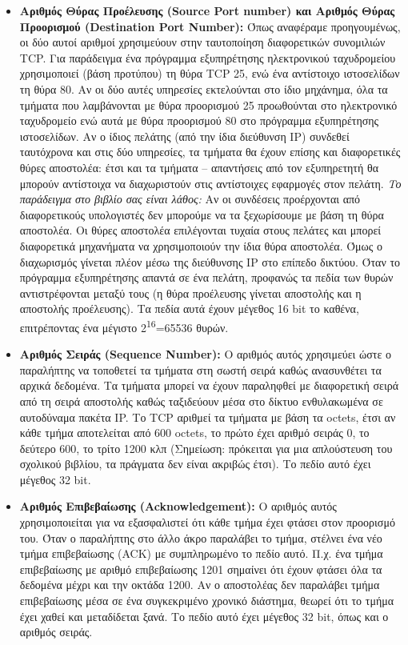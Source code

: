 \begin{itemize}
\item \textbf{Αριθμός Θύρας Προέλευσης (Source Port number) και Αριθμός Θύρας Προορισμού (Destination Port Number):} Όπως αναφέραμε προηγουμένως, οι δύο αυτοί αριθμοί χρησιμεύουν στην ταυτοποίηση διαφορετικών συνομιλιών TCP. Για παράδειγμα ένα πρόγραμμα εξυπηρέτησης ηλεκτρονικού ταχυδρομείου χρησιμοποιεί (βάση προτύπου) τη θύρα TCP 25, ενώ ένα αντίστοιχο ιστοσελίδων τη θύρα 80. Αν οι δύο αυτές υπηρεσίες εκτελούνται στο ίδιο μηχάνημα, όλα τα τμήματα που λαμβάνονται με θύρα προορισμού 25 προωθούνται στο ηλεκτρονικό ταχυδρομείο ενώ αυτά με θύρα προορισμού 80 στο πρόγραμμα εξυπηρέτησης ιστοσελίδων. Αν ο ίδιος πελάτης (από την ίδια διεύθυνση IP) συνδεθεί ταυτόχρονα και στις δύο υπηρεσίες, τα τμήματα θα έχουν επίσης και διαφορετικές θύρες αποστολέα: έτσι και τα τμήματα -- απαντήσεις από τον εξυπηρετητή θα μπορούν αντίστοιχα να διαχωριστούν στις αντίστοιχες εφαρμογές στον πελάτη. \emph{Το παράδειγμα στο βιβλίο σας είναι λάθος:} Αν οι συνδέσεις προέρχονται από διαφορετικούς υπολογιστές δεν μπορούμε να τα ξεχωρίσουμε με βάση τη θύρα αποστολέα. Οι θύρες αποστολέα επιλέγονται τυχαία στους πελάτες και μπορεί διαφορετικά μηχανήματα να χρησιμοποιούν την ίδια θύρα αποστολέα. Όμως ο διαχωρισμός γίνεται πλέον μέσω της διεύθυνσης IP στο επίπεδο δικτύου. Όταν το πρόγραμμα εξυπηρέτησης απαντά σε ένα πελάτη, προφανώς τα πεδία των θυρών αντιστρέφονται μεταξύ τους (η θύρα προέλευσης γίνεται αποστολής και η αποστολής προέλευσης). Τα πεδία αυτά έχουν μέγεθος 16 bit το καθένα, επιτρέποντας ένα μέγιστο 2\textsuperscript{16}=65536 θυρών.
\item \textbf{Αριθμός Σειράς (Sequence Number):} Ο αριθμός αυτός χρησιμεύει ώστε ο παραλήπτης να τοποθετεί τα τμήματα στη σωστή σειρά καθώς ανασυνθέτει τα αρχικά δεδομένα. Τα τμήματα μπορεί να έχουν παραληφθεί με διαφορετική σειρά από τη σειρά αποστολής καθώς ταξιδεύουν μέσα στο δίκτυο ενθυλακωμένα σε αυτοδύναμα πακέτα IP. Το TCP αριθμεί τα τμήματα με βάση τα octets, έτσι αν κάθε τμήμα αποτελείται από 600 octets, το πρώτο έχει αριθμό σειράς 0, το δεύτερο 600, το τρίτο 1200 κλπ (Σημείωση: πρόκειται για μια απλούστευση του σχολικού βιβλίου, τα πράγματα δεν είναι ακριβώς έτσι). Το πεδίο αυτό έχει μέγεθος 32 bit.
\item \textbf{Αριθμός Επιβεβαίωσης (Acknowledgement):} Ο αριθμός αυτός χρησιμοποιείται για να εξασφαλιστεί ότι κάθε τμήμα έχει φτάσει στον προορισμό του. Όταν ο παραλήπτης στο άλλο άκρο παραλάβει το τμήμα, στέλνει ένα νέο τμήμα επιβεβαίωσης (ACK) με συμπληρωμένο το πεδίο αυτό. Π.χ. ένα τμήμα επιβεβαίωσης με αριθμό επιβεβαίωσης 1201 σημαίνει ότι έχουν φτάσει όλα τα δεδομένα μέχρι και την οκτάδα 1200. Αν ο αποστολέας δεν παραλάβει τμήμα επιβεβαίωσης μέσα σε ένα συγκεκριμένο χρονικό διάστημα, θεωρεί ότι το τμήμα έχει χαθεί και μεταδίδεται ξανά. Το πεδίο αυτό έχει μέγεθος 32 bit, όπως και ο αριθμός σειράς.

\end{itemize}
